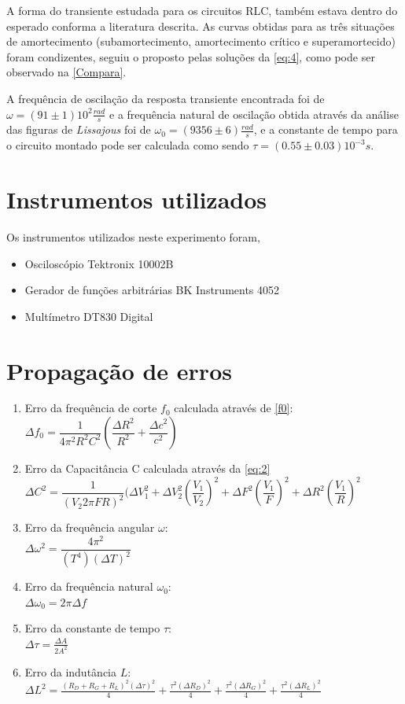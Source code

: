 \documentclass[11pt,a4paper]{article}
\begin{document}
    A forma do transiente estudada para os circuitos RLC, também estava dentro do esperado conforma a literatura descrita. As curvas obtidas para as três situações de amortecimento (subamortecimento, amortecimento crítico e superamortecido) foram condizentes, seguiu o proposto pelas soluções da \cref{eq:4}, como pode ser observado na \cref{Compara}.
    
    A frequência de oscilação da resposta transiente encontrada foi de $\omega = (91 \pm 1)10^2 \frac{rad}{s}$ e a frequência natural de oscilação obtida através da análise das figuras de \textit{Lissajous} foi de $\omega _0 = (9356 \pm 6)\frac{rad}{s}$, e a constante de tempo para o circuito montado pode ser calculada como sendo $\tau = (0.55 \pm 0.03)10^{-3}s$.

\section{Instrumentos utilizados}
Os instrumentos utilizados neste experimento foram,
\begin{itemize}
	\item Osciloscópio Tektronix 10002B
	\item Gerador de funções arbitrárias BK Instruments 4052
	\item Multímetro DT830 Digital
\end{itemize}


\section{Propagação de erros \label{ap:erros}}

\begin{enumerate}
    \item Erro da frequência de corte $f_0$ calculada através de \cref{f0}: \\$\Delta f_{0}=\dfrac {1}{4\pi ^{2}R^{2}C^{2}}\left( \dfrac {\Delta R^{2}}{R^{2}}+\dfrac {\Delta c^{2}}{c^{2}}\right)$
    \item Erro da Capacitância C calculada através da \cref{eq:2}\\
    $\Delta C^{2}=\dfrac {1}{\left( V_{2}2\pi FR\right) ^{2}}(\Delta V^{2}_{1}+\Delta V^{2}_{2}\left( \dfrac {V_{1}}{V_{2}}\right) ^{2}+\Delta F^{2}\left( \dfrac {V_{1}}{F}\right) ^{2}+\Delta R^{2}\left( \dfrac {V_{1}}{R}\right) ^{2}$
    \item Erro da frequência angular $\omega :$\\
    $\Delta \omega^{2}=\dfrac {4\pi^2}{(T^4)(\Delta T)^2}$
    \item Erro da frequência natural $\omega _0:$\\
    $\Delta \omega_0 = {2\pi}{\Delta f}$
    \item Erro da constante de tempo $\tau:$\\
    $\Delta \tau = \frac{\Delta A}{2A^2}$
    \item Erro da indutância $L:$\\
    $\Delta L^2 = \frac{(R_D + R_G + R_L)^2 (\Delta \tau)^2}{4} + \frac{\tau ^2(\Delta R_D)^2}{4} + \frac{\tau ^2(\Delta R_G)^2}{4} + \frac{\tau ^2(\Delta R_L)^2}{4}$
\end{enumerate}
\end{document}
